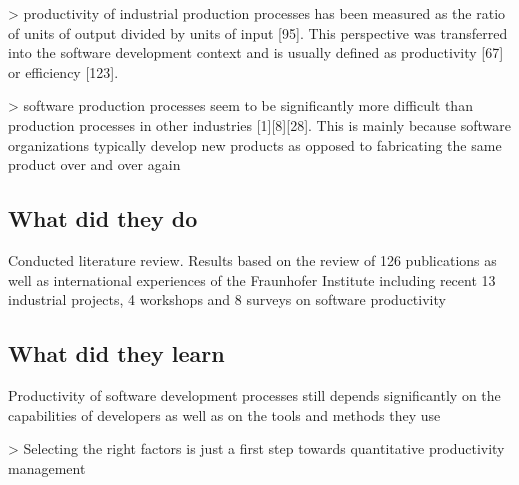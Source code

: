 > productivity of industrial production processes has been measured as the ratio of units of output divided by units of input [95]. This perspective was transferred into the software development context and is usually defined as productivity [67] or efficiency [123].

> software production processes seem to be significantly more difficult than production processes in other industries [1][8][28]. This is mainly because software organizations typically develop new products as opposed to fabricating the same product over and over again %

\subsection{What did they do}

Conducted literature review. Results based on the review of 126 publications as well as international experiences of the Fraunhofer Institute including recent 13 industrial projects, 4 workshops and 8 surveys on software productivity

\subsection{What did they learn}

Productivity of software development processes still depends significantly on the capabilities of developers as well as on the tools and methods they use

> Selecting the right factors is just a first step towards quantitative productivity management
